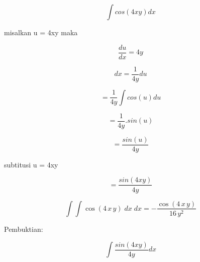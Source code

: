 \documentclass[a4paper,10pt]{article}
\begin{document}
\begin{eulernotebook}
\begin{eulercomment}
\begin{eulercomment}
\begin{eulercomment}
\begin{eulercomment}
\begin{eulercomment}
\begin{eulercomment}
\begin{eulercomment}
\begin{eulercomment}
\begin{eulercomment}
\begin{eulercomment}
\begin{eulercomment}
\begin{eulercomment}
\begin{eulercomment}
\begin{eulercomment}
\begin{eulerformula}
\[
\int cos(4xy) dx
\]
\end{eulerformula}
\begin{eulercomment}
\end{eulercomment}
\begin{eulerttcomment}
 misalkan u = 4xy maka
\end{eulerttcomment}
\begin{eulerformula}
\[
\frac {du} {dx} = 4y
\]
\end{eulerformula}
\begin{eulerformula}
\[
dx = \frac {1} {4y} du
\]
\end{eulerformula}
\begin{eulercomment}
\end{eulercomment}
\begin{eulerformula}
\[
= \frac {1} {4y} \int cos(u) du
\]
\end{eulerformula}
\begin{eulercomment}
\end{eulercomment}
\begin{eulerformula}
\[
= \frac {1} {4y} . sin(u)
\]
\end{eulerformula}
\begin{eulercomment}
\end{eulercomment}
\begin{eulerformula}
\[
= \frac {sin(u)} {4y}
\]
\end{eulerformula}
\begin{eulercomment}
\end{eulercomment}
\begin{eulerttcomment}
 subtitusi u = 4xy
\end{eulerttcomment}
\begin{eulerformula}
\[
= \frac {sin(4xy)} {4y}
\]
\end{eulerformula}
\begin{eulerformula}
\[
\int {\int {\cos \left(4\,x\,y\right)}{\;dx}}{\;dx}=-\frac{\cos   \left(4\,x\,y\right)}{16\,y^2}
\]
\end{eulerformula}
\begin{eulerttcomment}
   Pembuktian:
\end{eulerttcomment}
\begin{eulercomment}
\end{eulercomment}
\begin{eulerformula}
\[
\int \frac {sin(4xy)} {4y} dx
\]
\end{eulerformula}
\end{eulercomment}
\end{eulercomment}
\end{eulercomment}
\end{eulercomment}
\end{eulercomment}
\end{eulercomment}
\end{eulercomment}
\end{eulercomment}
\end{eulercomment}
\end{eulercomment}
\end{eulercomment}
\end{eulercomment}
\end{eulercomment}
\end{eulercomment}
\end{eulernotebook}
\end{document}
